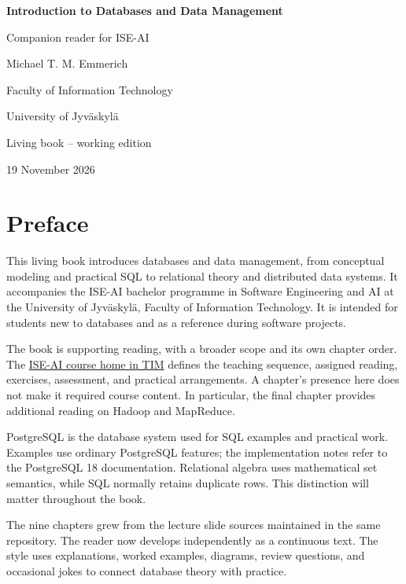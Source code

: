 \documentclass[11pt,a4paper,openany]{book}
\begin{document}
\frontmatter
\begin{titlepage}
\centering
{\Huge\bfseries Introduction to Databases and Data Management\par}
\vspace{1.5cm}
{\Large Companion reader for ISE-AI\par}
\vspace{2cm}
{\Large Michael T. M. Emmerich\par}
\vspace{0.5cm}
{\large Faculty of Information Technology\par}
{\large University of Jyväskylä\par}
\vfill
{\large Living book -- working edition\par}
\vspace{0.3cm}
{\large 19 November 2026\par}
\end{titlepage}

\chapter*{Preface}
This living book introduces databases and data management, from conceptual modeling and practical SQL to relational theory and distributed data systems. It accompanies the ISE-AI bachelor programme in Software Engineering and AI at the University of Jyväskylä, Faculty of Information Technology. It is intended for students new to databases and as a reference during software projects.

The book is supporting reading, with a broader scope and its own chapter order. The \href{https://tim.jyu.fi/view/kurssit/it/iseai/26-27/databases/home}{ISE-AI course home in TIM} defines the teaching sequence, assigned reading, exercises, assessment, and practical arrangements. A chapter's presence here does not make it required course content. In particular, the final chapter provides additional reading on Hadoop and MapReduce.

PostgreSQL is the database system used for SQL examples and practical work. Examples use ordinary PostgreSQL features; the implementation notes refer to the PostgreSQL 18 documentation. Relational algebra uses mathematical set semantics, while SQL normally retains duplicate rows. This distinction will matter throughout the book.

The nine chapters grew from the lecture slide sources maintained in the same repository. The reader now develops independently as a continuous text. The style uses explanations, worked examples, diagrams, review questions, and occasional jokes to connect database theory with practice.
\end{document}
